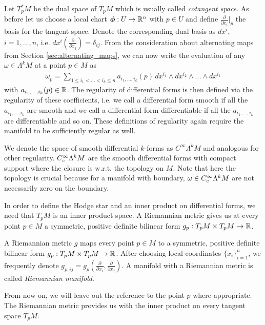 \documentclass[../master_thesis.tex]{subfiles}
\begin{document}
Let $T_p^* M$ be the dual space of $T_p M$ which is usually called 
\textit{cotangent space}.
As before let us choose a local chart $\boldsymbol{\phi}: U \rightarrow \mathbb{R}^n$ with 
$p \in U$ and define $\frac{\partial}{\partial x_i}|_p$ the basis for the tangent space. 
Denote the corresponding
dual basis as $dx^i$, $i = 1,...,n$, i.e. 
$dx^i(\frac{\partial}{\partial x_j}) = \delta_{ij}$. 
From the consideration about
alternating maps from Section \ref{sec:alternating_maps}, we can now write the evaluation of any 
$\omega \in \Lambda^k M$ at a point $p \in M$ as 
\begin{align*}
    \omega_p = \sum\limits_{1\leq i_1 < ... < i_k \leq n} 
        a_{i_1,...,i_k}(p) \,dx^{i_1} \wedge dx^{i_2} \wedge ... \wedge dx^{i_k}
\end{align*}
with $a_{i_1,...,i_k}(p) \in \mathbb{R}$. The regularity of differential forms 
is then defined via the regularity of these coefficients, i.e. we call 
a differential form smooth if all the $a_{i_1,...,i_k}$ are smooth 
and we call a differential form differentiable if all the $a_{i_1,...,i_k}$
are differentiable and so on. These definitions of regularity again require 
the manifold to be sufficiently regular as well.

We denote the 
space of smooth differential $k$-forms as $C^\infty \Lambda^k M$ and analogous for other regularity.
$C_c^\infty \Lambda^{k} M$ are the smooth differential forms
with compact support where the closure is w.r.t. 
the topology on $M$. Note that here the topology is crucial because for a manifold with boundary, 
$\omega \in C_c^\infty \Lambda^{k} M$ are not necessarily zero on the boundary.

In order to define the Hodge star and an inner product on differential forms,
we need that 
$T_p M$ is an inner product space.
A Riemannian metric gives us at every point $p \in M$ 
a symmetric, positive definite bilinear form 
$g_p: T_p M \times T_p M \rightarrow \mathbb{R}$. 
\begin{definition}
    A Riemannian metric $g$ maps every point $p\in M$ to 
    a symmetric, positive definite bilinear form $g_p: T_p M \times T_p M \rightarrow \mathbb{R}$.
    After choosing local coordinates $\{x_i\}_{i=1}^n$, we frequently denote 
    $g_{p,ij} = g_p(\frac{\partial}{\partial x_i}, \frac{\partial}{\partial x_j})$.
    A manifold with a Riemannian metric is called 
    \textit{Riemannian manifold}.
\end{definition}
From now on, we will leave out the reference to the point $p$ where appropriate.
The Riemannian metric provides us with the 
inner product on every tangent space $T_p M$. 
\end{document}
